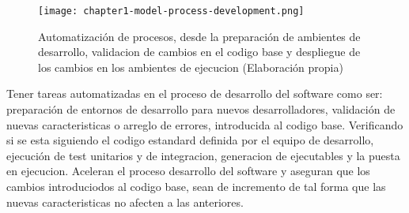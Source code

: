 \begin{figure}[ht]
  \centering
  \texttt{[image: chapter1-model-process-development.png]}
  \caption{Automatización de procesos, desde la preparación de ambientes de desarrollo, validacion de cambios en el codigo base y despliegue de los cambios en los ambientes de ejecucion (Elaboración propia)}  
\end{figure}
\noindent Tener tareas automatizadas en el proceso de desarrollo del software como ser: preparación de entornos de desarrollo para nuevos desarrolladores, validación de nuevas caracteristicas o arreglo de errores, introducida al codigo base. Verificando si se esta siguiendo el codigo estandard definida por el equipo de desarrollo, ejecución de test unitarios y de integracion, generacion de ejecutables y la puesta en ejecucion. Aceleran el proceso desarrollo del software y aseguran que los cambios introduciodos al codigo base, sean de incremento de tal forma que las nuevas caracteristicas no afecten a las anteriores.




